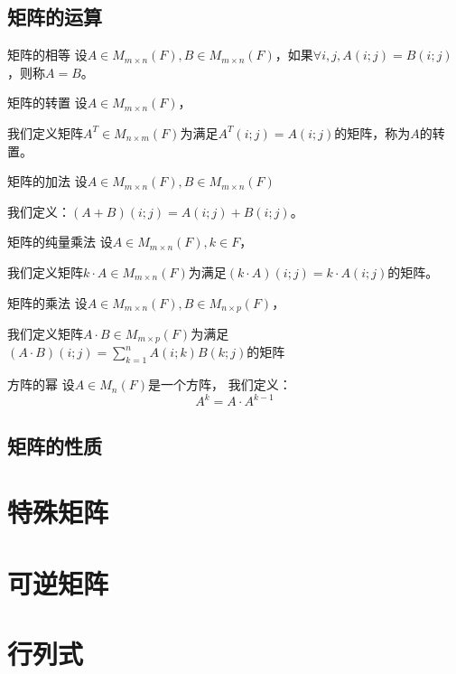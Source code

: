 \documentclass[12pt, a4paper, oneside, UTF8]{ctexbook}
\begin{document}
		\subsection{矩阵的运算}
		\begin{para}{0}
			    \begin{defn}{矩阵的相等}{}
				    设$A\in M_{m\times n}(F),B\in M_{m \times n}(F)$，如果$\forall i,j,A(i;j)=B(i;j)$，则称$A=B$。
				\end{defn}
				\begin{defn}{矩阵的转置}{}
				    设$A\in M_{m \times n}(F)$，
					
					我们定义矩阵$A^T \in M_{n \times m}(F)$为满足$A^T(i;j)=A(i;j)$的矩阵，称为$A$的转置。
				\end{defn}
				\begin{defn}{矩阵的加法}{}
				    设$A\in M_{m \times n}(F),B\in M_{m \times n}(F)$
					
					我们定义：$(A+B)(i;j)=A(i;j)+B(i;j)$。
				\end{defn}
				\begin{defn}{矩阵的纯量乘法}{}
				    设$A\in M_{m \times n}(F),k \in F$，
					
					我们定义矩阵$k\cdot A \in M_{m\times n}(F)$为满足$(k\cdot  A)(i;j)=k\cdot A(i;j)$的矩阵。
				\end{defn}
				\begin{defn}{矩阵的乘法}{}
				    设$A\in M_{m\times n}(F),B\in M_{n \times p}(F)$，
					
					我们定义矩阵$A\cdot B \in M_{m\times p}(F)$为满足$(A\cdot B)(i;j)=\sum_{k=1}^n A(i;k)B(k;j)$的矩阵
				\end{defn}
				\begin{defn}{方阵的幂}{}
					设$A \in M_n (F)$是一个方阵，
					我们定义：$$A^k=A\cdot A^{k-1}$$
				\end{defn}
		\end{para}
		\subsection{矩阵的性质}
	\section{特殊矩阵}
	\section{可逆矩阵}
	\section{行列式}
\end{document}
